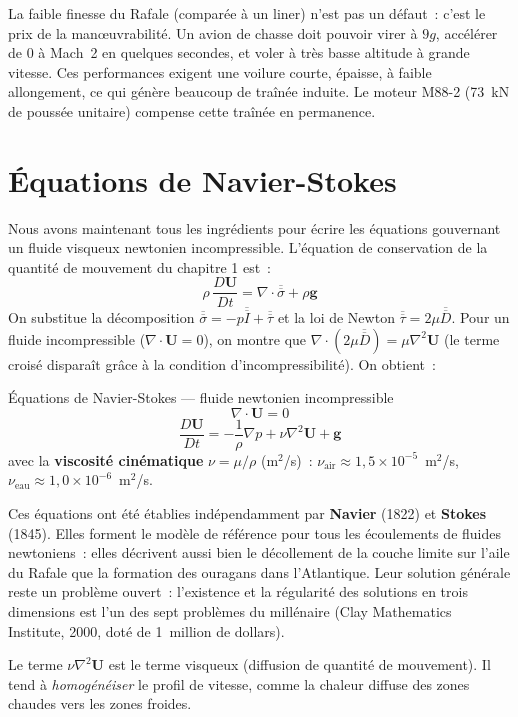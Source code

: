 \documentclass[11pt,a4paper]{report}
\newcommand{\DD}[1]{\dfrac{D #1}{Dt}}
\newcommand{\ten}[1]{\overline{\overline{#1}}}   %
\begin{document}
\medskip
La faible finesse du Rafale (comparée à un liner) n'est pas un défaut~: c'est le
prix de la manœuvrabilité. Un avion de chasse doit pouvoir virer à $9g$, accélérer
de $0$ à Mach~2 en quelques secondes, et voler à très basse altitude à grande
vitesse. Ces performances exigent une voilure courte, épaisse, à faible allongement,
ce qui génère beaucoup de traînée induite. Le moteur M88-2 (73~kN de poussée unitaire)
compense cette traînée en permanence.

\section{Équations de Navier-Stokes}

Nous avons maintenant tous les ingrédients pour écrire les équations gouvernant
un fluide visqueux newtonien incompressible. L'équation de conservation de la
quantité de mouvement du chapitre 1 est~:
\[
    \rho\,\DD{\bm{U}} = \nabla\cdot\ten{\sigma} + \rho\bm{g}
\]
On substitue la décomposition $\ten{\sigma}=-p\ten{I}+\ten{\tau}$ et la loi de
Newton $\ten{\tau}=2\mu\ten{D}$. Pour un fluide incompressible
($\nabla\cdot\bm{U}=0$), on montre que $\nabla\cdot(2\mu\ten{D})=\mu\nabla^2\bm{U}$
(le terme croisé disparaît grâce à la condition d'incompressibilité). On obtient~:

\begin{importantbox}{Équations de Navier-Stokes --- fluide newtonien incompressible}
\[
    \nabla\cdot\bm{U} = 0
\]
\[
    \DD{\bm{U}} = -\frac{1}{\rho}\nabla p + \nu\nabla^2\bm{U} + \bm{g}
\]
avec la \textbf{viscosité cinématique} $\nu = \mu/\rho$ (m$^2$/s)~:
\quad $\nu_\text{air} \approx 1{,}5\times10^{-5}$~m$^2$/s,
\quad $\nu_\text{eau} \approx 1{,}0\times10^{-6}$~m$^2$/s.
\end{importantbox}

Ces équations ont été établies indépendamment par \textbf{Navier} (1822) et
\textbf{Stokes} (1845). Elles forment le modèle de référence pour tous les
écoulements de fluides newtoniens~: elles décrivent aussi bien le décollement de
la couche limite sur l'aile du Rafale que la formation des ouragans dans
l'Atlantique. Leur solution générale reste un problème ouvert~: l'existence et la
régularité des solutions en trois dimensions est l'un des sept problèmes du
millénaire (Clay Mathematics Institute, 2000, doté de 1~million de dollars).

Le terme $\nu\nabla^2\bm{U}$ est le terme visqueux (diffusion de quantité de
mouvement). Il tend à \emph{homogénéiser} le profil de vitesse, comme la chaleur
diffuse des zones chaudes vers les zones froides.
\end{document}
